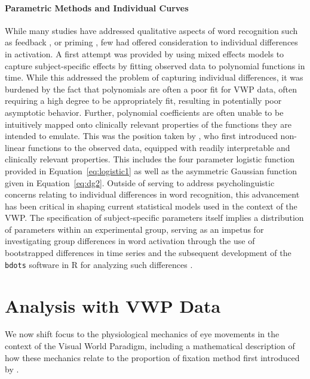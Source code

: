 \documentclass{article}
\newcommand{\xt}{\texttt}
\begin{document}
\paragraph{Parametric Methods and Individual Curves} While many studies have addressed qualitative aspects of word recognition such as feedback \citep{Magnuson2003}, or priming \citep{luce1998delayed}, few had offered consideration to individual differences in activation. A first attempt was provided by \citet{Mirman2008} using mixed effects models to capture subject-specific effects by fitting observed data to polynomial functions in time. While this addressed the problem of capturing individual differences, it was burdened by the fact that polynomials are often a poor fit for VWP data, often requiring a high degree to be appropriately fit, resulting in potentially poor asymptotic behavior. Further, polynomial coefficients are often unable to be intuitively mapped onto clinically relevant properties of the functions they are intended to emulate. This was the position taken by \citet{mcmurray2010individual}, who first introduced non-linear functions to the observed data, equipped with readily interpretable and clinically relevant properties. This includes the four parameter logistic function provided in Equation~\ref{eq:logistic1} as well as the asymmetric Gaussian function given in Equation~\ref{eq:dg2}. Outside of serving to address psycholinguistic concerns relating to individual differences in word recognition, this advancement has been critical in shaping current statistical models used in the context of the VWP. The specification of subject-specific parameters itself implies a distribution of parameters within an experimental group, serving as an impetus for investigating group differences in word activation through the use of bootstrapped differences in time series \citep{oleson2017detecting} and the subsequent development of the \xt{bdots} software in R for analyzing such differences \citep{seedorff2018bdots}.



\section{Analysis with VWP Data}

We now shift focus to the physiological mechanics of eye movements in the context of the Visual World Paradigm, including a mathematical description of how these mechanics relate to the proportion of fixation method first introduced by \citet{allopenna1998tracking}.  
\end{document}

